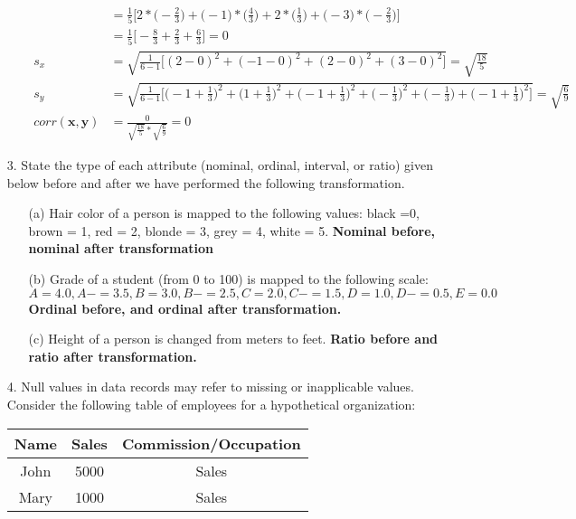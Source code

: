 \documentclass{article}
\begin{document}
\begin{itemize}
\begin{itemize}
\begin{align}
            &=\frac{1}{5}\Bigg[2*\Big(-\frac{2}{3}\Big)+\Big(-1\Big)*\Big(\frac{4}{3}\Big)+2*\Big(\frac{1}{3}\Big)+\Big(-3\Big)*\Big(-\frac{2}{3}\Big)\Bigg]\nonumber\\
            &=\frac{1}{5}\Bigg[-\frac{8}{3}+\frac{2}{3}+\frac{6}{3}\Bigg]=0\nonumber\\
            s_x&=\sqrt{\frac{1}{6-1}\Bigg[(2-0)^2+(-1-0)^2+(2-0)^2+(3-0)^2\Bigg]}=\sqrt{\frac{18}{5}}\nonumber\\
            s_y&=\sqrt{\frac{1}{6-1}\Bigg[\Big(-1+\frac{1}{3}\Big)^2+\Big(1+\frac{1}{3}\Big)^2+\Big(-1+\frac{1}{3}\Big)^2+\Big(-\frac{1}{3}\Big)^2+\Big(-\frac{1}{3}\Big)+\Big(-1+\frac{1}{3}\Big)^2\Bigg]}=\sqrt{\frac{6}{9}}\nonumber\\
            corr(\textbf{x},\textbf{y})&=\frac{0}{\sqrt{\frac{18}{5}}*\sqrt{\frac{6}{9}}}=0\nonumber
        \end{align}
    \end{itemize}
    \item[3.] State the type of each attribute (nominal, ordinal, interval, or ratio) given below before and after we have performed the following transformation.
    \begin{itemize}
        \item[(a)] Hair color of a person is mapped to the following values: black =0, brown = 1, red = 2, blonde = 3, grey = 4, white = 5. \textbf{Nominal before, nominal after transformation}        
        \item[(b)] Grade of a student (from 0 to 100) is mapped to the following scale: $A = 4.0, A- = 3.5, B = 3.0, B- = 2.5, C = 2.0, C- = 1.5, D = 1.0,D- = 0.5, E = 0.0$ \textbf{Ordinal before, and ordinal after transformation.}
        \item[(c)] Height of a person is changed from meters to feet. \textbf{Ratio before and ratio after transformation.}
    \end{itemize}
    \item[4.] Null values in data records may refer to missing or inapplicable values. Consider the following table of employees for a hypothetical organization:
    \begin{center}
        \begin{tabular}{|c|c|c|}
            \hline
            Name & Sales & Commission/Occupation \\
            \hline
            John & 5000 & Sales \\
            \hline
            Mary & 1000 & Sales \\

\end{tabular}
\end{center}
\end{itemize}
\end{document}
